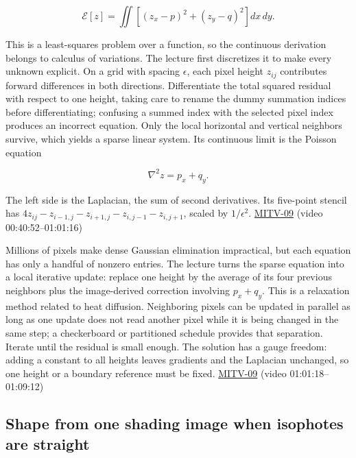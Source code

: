 \[
\mathcal E[z]=\iint\left[(z_x-p)^2+(z_y-q)^2\right]dx\,dy.
\]

This is a least-squares problem over a function, so the continuous derivation belongs to calculus of variations. The lecture first discretizes it to make every unknown explicit. On a grid with spacing \(\epsilon\), each pixel height \(z_{ij}\) contributes forward differences in both directions. Differentiate the total squared residual with respect to one height, taking care to rename the dummy summation indices before differentiating; confusing a summed index with the selected pixel index produces an incorrect equation. Only the local horizontal and vertical neighbors survive, which yields a sparse linear system. Its continuous limit is the Poisson equation

\[
\nabla^2 z=p_x+q_y.
\]

The left side is the Laplacian, the sum of second derivatives. Its five-point stencil has \(4z_{ij}-z_{i-1,j}-z_{i+1,j}-z_{i,j-1}-z_{i,j+1}\), scaled by \(1/\epsilon^2\). \hyperref[04-visual-computing-ii-ch036-mitv-09---shape-from-shading-general-case---from-first-order-nonlinear-pde-to-five-odes]{MITV-09} (video 00:40:52--01:01:16)

Millions of pixels make dense Gaussian elimination impractical, but each equation has only a handful of nonzero entries. The lecture turns the sparse equation into a local iterative update: replace one height by the average of its four previous neighbors plus the image-derived correction involving \(p_x+q_y\). This is a relaxation method related to heat diffusion. Neighboring pixels can be updated in parallel as long as one update does not read another pixel while it is being changed in the same step; a checkerboard or partitioned schedule provides that separation. Iterate until the residual is small enough. The solution has a gauge freedom: adding a constant to all heights leaves gradients and the Laplacian unchanged, so one height or a boundary reference must be fixed. \hyperref[04-visual-computing-ii-ch036-mitv-09---shape-from-shading-general-case---from-first-order-nonlinear-pde-to-five-odes]{MITV-09} (video 01:01:18--01:09:12)

\subsection{Shape from one shading image when isophotes are straight}\label{04-visual-computing-ii-ch032-shape-from-one-shading-image-when-isophotes-are-straight}

